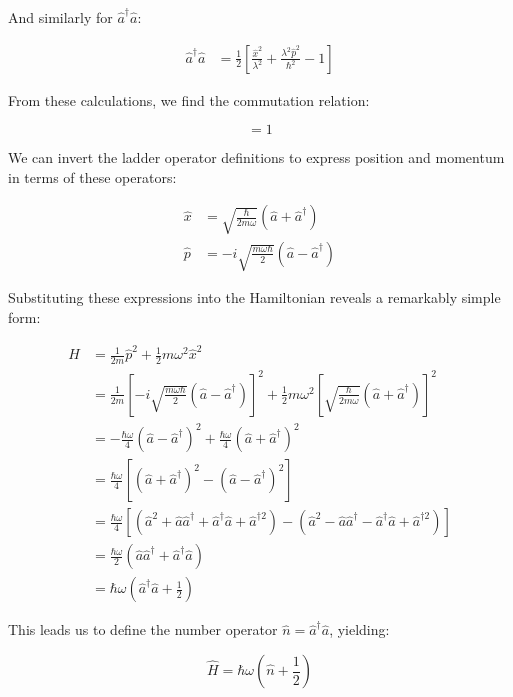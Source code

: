 \documentclass[italian]{HKNdocument}
\begin{document}
And similarly for $\hat{a}^\dagger\hat{a}$:

\begin{align*}
\hat{a}^\dagger\hat{a} &= \frac{1}{2}\left[\frac{\hat{x}^2}{\lambda^2} + \frac{\lambda^2\hat{p}^2}{\hbar^2} - 1\right] \tag{5.9}
\end{align*}

From these calculations, we find the commutation relation:

\begin{equation*}
[a,a^\dagger] = 1 \tag{5.10}
\end{equation*}

We can invert the ladder operator definitions to express position and momentum in terms of these operators:

\begin{align*}
\hat{x} &= \sqrt{\frac{\hbar}{2m\omega}}(\hat{a} + \hat{a}^\dagger) \\
\hat{p} &= -i\sqrt{\frac{m\omega\hbar}{2}}(\hat{a} - \hat{a}^\dagger) \tag{5.11}
\end{align*}

Substituting these expressions into the Hamiltonian reveals a remarkably simple form:

\begin{align*}
\hat{H} &= \frac{1}{2m}\hat{p}^2 + \frac{1}{2}m\omega^2\hat{x}^2 \\
&= \frac{1}{2m}\left[-i\sqrt{\frac{m\omega\hbar}{2}}(\hat{a} - \hat{a}^\dagger)\right]^2 + \frac{1}{2}m\omega^2\left[\sqrt{\frac{\hbar}{2m\omega}}(\hat{a} + \hat{a}^\dagger)\right]^2 \\
&= -\frac{\hbar\omega}{4}(\hat{a} - \hat{a}^\dagger)^2 + \frac{\hbar\omega}{4}(\hat{a} + \hat{a}^\dagger)^2 \\
&= \frac{\hbar\omega}{4}[(\hat{a} + \hat{a}^\dagger)^2 - (\hat{a} - \hat{a}^\dagger)^2] \tag{5.12} \\
&= \frac{\hbar\omega}{4}[(\hat{a}^2 + \hat{a}\hat{a}^\dagger + \hat{a}^\dagger\hat{a} + \hat{a}^{\dagger2}) - (\hat{a}^2 - \hat{a}\hat{a}^\dagger - \hat{a}^\dagger\hat{a} + \hat{a}^{\dagger2})] \\
&= \frac{\hbar\omega}{2}(\hat{a}\hat{a}^\dagger + \hat{a}^\dagger\hat{a}) \\
&= \hbar\omega\left(\hat{a}^\dagger\hat{a} + \frac{1}{2}\right)
\end{align*}

This leads us to define the number operator $\hat{n} = \hat{a}^\dagger\hat{a}$, yielding:

\begin{equation*}
\hat{H} = \hbar\omega\left(\hat{n} + \frac{1}{2}\right) \tag{5.13}
\end{equation*}
\end{document}
